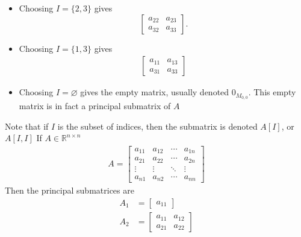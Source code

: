 \documentclass{report}
\begin{document}
\begin{itemize}
\begin{itemize}
                \item Choosing $I = \{2,3\}$ gives
                    \[
                        \begin{bmatrix}
                            a_{22} & a_{23} \\
                            a_{32} & a_{33}
                        \end{bmatrix}.
                    \]
                \item Choosing $I = \{1,3\} $ gives
                    \begin{align*}
                        \begin{bmatrix}
                            a_{11} & a_{13} \\
                            a_{31} & a_{33}
                        \end{bmatrix}
                    \end{align*}
                \item Choosing $I = \varnothing$ gives the empty matrix, usually denoted $0_{M_{0,0}}$. This empty matrix is in fact a principal submatrix of $A$
            \end{itemize}
            \bigbreak \noindent 
            Note that if $I$ is the subset of indices, then the submatrix is denoted $A[I]$, or $A[I,I]$
            \bigbreak \noindent 
            If $A\in\mathbb{R}^{n\times n} $
            \begin{align*}
                A = \begin{bmatrix}
                    a_{11} & a_{12} & \cdots &a_{1n} \\
                    a_{21} & a_{22} & \cdots &a_{2n} \\
                    \vdots & \vdots & \ddots & \vdots \\
                    a_{n1} & a_{n2} & \cdots &a_{nn}
                \end{bmatrix}
            \end{align*}
            Then the principal submatrices are
            \begin{align*}
                A_{1} &= \begin{bmatrix}
                    a_{11}
                \end{bmatrix} \\
                    A_{2} &= \begin{bmatrix}
                    a_{11} & a_{12} \\
                    a_{21} & a_{22}
                \end{bmatrix} \\

\end{align*}
\end{itemize}
\end{document}
